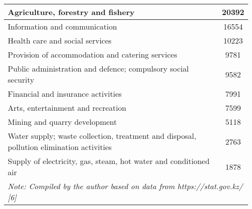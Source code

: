 \begin{table}[H]
\begin{tabular}{|lc|}
\multicolumn{1}{|p{0.7\textwidth}|}{Agriculture, forestry and fishery}                                                          & 20392                                    \\ \hline
\multicolumn{1}{|p{0.7\textwidth}|}{Information and communication}                                                            & 16554                                    \\ \hline
\multicolumn{1}{|p{0.7\textwidth}|}{Health care and social services}                                                          & 10223                                    \\ \hline
\multicolumn{1}{|p{0.7\textwidth}|}{Provision of accommodation and catering services}                                         & 9781                                     \\ \hline
\multicolumn{1}{|p{0.7\textwidth}|}{Public administration and defence; compulsory social security}                            & 9582                                     \\ \hline
\multicolumn{1}{|p{0.7\textwidth}|}{Financial and insurance activities}                                                       & 7991                                     \\ \hline
\multicolumn{1}{|p{0.7\textwidth}|}{Arts, entertainment and recreation}                                                       & 7599                                     \\ \hline
\multicolumn{1}{|p{0.7\textwidth}|}{Mining and quarry development}                                                               & 5118                                     \\ \hline
\multicolumn{1}{|p{0.7\textwidth}|}{Water supply; waste collection, treatment and disposal, pollution elimination activities} & 2763                                     \\ \hline
\multicolumn{1}{|p{0.7\textwidth}|}{Supply of electricity, gas, steam, hot water and conditioned air}                         & 1878                                     \\ \hline
\multicolumn{2}{|p{0.7\textwidth}|}{\textit{Note: Compiled by the author based on data from https://stat.gov.kz/ {[}6{]}}}                                               \\ \hline
\end{tabular}
\end{table}

